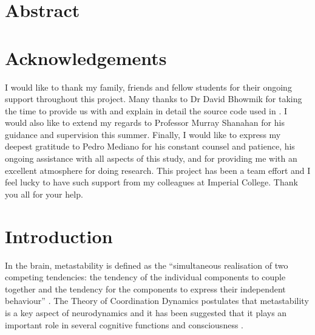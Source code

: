 \documentclass[a4paper,11pt]{article}
\begin{document}
\null
\clearpage

\section{Abstract}

\section{Acknowledgements}
I would like to thank my family, friends and fellow students for their ongoing support throughout this project. Many thanks to Dr David Bhowmik for taking the time to provide us with and explain in detail the source code used in \cite{Bhowmik2013}. I would also like to extend my regards to Professor Murray Shanahan for his guidance and supervision this summer. Finally, I would like to express my deepest gratitude to Pedro Mediano for his constant counsel and patience, his ongoing assistance with all aspects of this study, and for providing me with an excellent atmosphere for doing research. This project has been a team effort and I feel lucky to have such support from my colleagues at Imperial College. Thank you all for your help.
\clearpage

\tableofcontents
\clearpage

\null
\clearpage

\section{Introduction}
\label{sec:intro}
In the brain, metastability is defined as the ``simultaneous realisation of two competing tendencies: the tendency of the individual components to couple together and the tendency for the components to express their independent behaviour'' \cite{Kelso2012}. The Theory of Coordination Dynamics postulates that metastability is a key aspect of neurodynamics and it has been suggested that it plays an important role in several cognitive functions and consciousness \cite{Seth2009}. 
\end{document}
